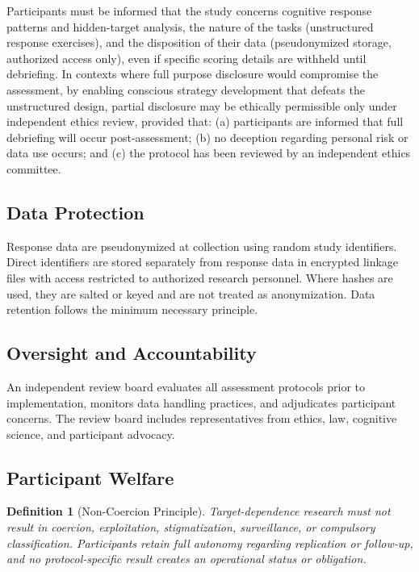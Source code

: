 \documentclass[11pt,letterpaper]{article}
\newtheorem{definition}{Definition}
\begin{document}
Participants must be informed that the study concerns cognitive response patterns and hidden-target analysis, the nature of the tasks (unstructured response exercises), and the disposition of their data (pseudonymized storage, authorized access only), even if specific scoring details are withheld until debriefing. In contexts where full purpose disclosure would compromise the assessment, by enabling conscious strategy development that defeats the unstructured design, partial disclosure may be ethically permissible only under independent ethics review, provided that: (a) participants are informed that full debriefing will occur post-assessment; (b) no deception regarding personal risk or data use occurs; and (c) the protocol has been reviewed by an independent ethics committee.

\subsection{Data Protection}

Response data are pseudonymized at collection using random study identifiers. Direct identifiers are stored separately from response data in encrypted linkage files with access restricted to authorized research personnel. Where hashes are used, they are salted or keyed and are not treated as anonymization. Data retention follows the minimum necessary principle.

\subsection{Oversight and Accountability}

An independent review board evaluates all assessment protocols prior to implementation, monitors data handling practices, and adjudicates participant concerns. The review board includes representatives from ethics, law, cognitive science, and participant advocacy.

\subsection{Participant Welfare}

\begin{definition}[Non-Coercion Principle]
Target-dependence research must not result in coercion, exploitation, stigmatization, surveillance, or compulsory classification. Participants retain full autonomy regarding replication or follow-up, and no protocol-specific result creates an operational status or obligation.
\end{definition}
\end{document}

